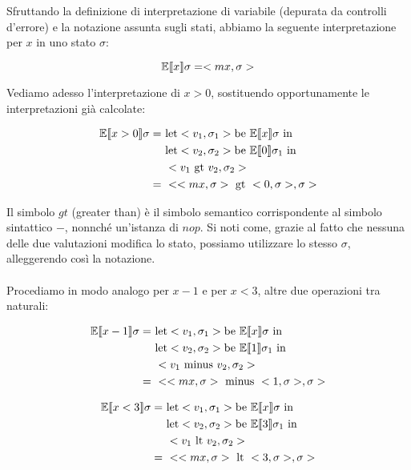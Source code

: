     Sfruttando la definizione di interpretazione di variabile (depurata da controlli d'errore) e la notazione assunta sugli stati, abbiamo la seguente interpretazione per $x$ in uno stato $\sigma$:
    
    \begin{equation*}
        \mathbb{E}\llbracket x \rrbracket\sigma = <mx, \sigma>
    \end{equation*}
    
    Vediamo adesso l'interpretazione di $x>0$, sostituendo opportunamente le interpretazioni già calcolate:
    
    \begin{align*}
        \mathbb{E}\doublebracket{x>0}\sigma =\ & \mbox{let} <v_1,\sigma_1> \mbox{be}\ \mathbb{E}\doublebracket{x}\sigma\ \mbox{in}\\
        &\mbox{let} <v_2,\sigma_2> \mbox{be}\ \mathbb{E}\doublebracket{0}\sigma_1\ \mbox{in}\\
        &<v_1\ \mbox{gt}\ v_2, \sigma_2>\\
        =\ & <<mx,\sigma>\ \mbox{gt}\ <0, \sigma>, \sigma>
    \end{align*}
    
    Il simbolo $gt$ (greater than) è il simbolo semantico corrispondente al simbolo sintattico $-$, nonnché un'istanza di $nop$. Si noti come, grazie al fatto che nessuna delle due valutazioni modifica lo stato, possiamo utilizzare lo stesso $\sigma$, alleggerendo così la notazione.\\
    \\
    Procediamo in modo analogo per $x-1$ e per $x<3$, altre due operazioni tra naturali:
    
    \begin{align*}
        \mathbb{E}\doublebracket{x-1}\sigma =\ & \mbox{let} <v_1,\sigma_1> \mbox{be}\ \mathbb{E}\doublebracket{x}\sigma\ \mbox{in}\\
        &\mbox{let} <v_2,\sigma_2> \mbox{be}\  \mathbb{E}\doublebracket{1}\sigma_1\ \mbox{in}\\
        &<v_1\ \mbox{minus}\ v_2, \sigma_2>\\
        =\ & <<mx,\sigma>\ \mbox{minus}\ <1, \sigma>, \sigma>
    \end{align*}
    
    \begin{align*}
        \mathbb{E}\doublebracket{x<3}\sigma =\ & \mbox{let} <v_1,\sigma_1> \mbox{be}\ \mathbb{E}\doublebracket{x}\sigma\ \mbox{in}\\
        &\mbox{let} <v_2,\sigma_2> \mbox{be}\ \mathbb{E}\doublebracket{3}\sigma_1\ \mbox{in}\\
        &<v_1\ \mbox{lt}\ v_2, \sigma_2>\\
        =\ & <<mx,\sigma>\ \mbox{lt}\ <3, \sigma>, \sigma>
    \end{align*}
    
